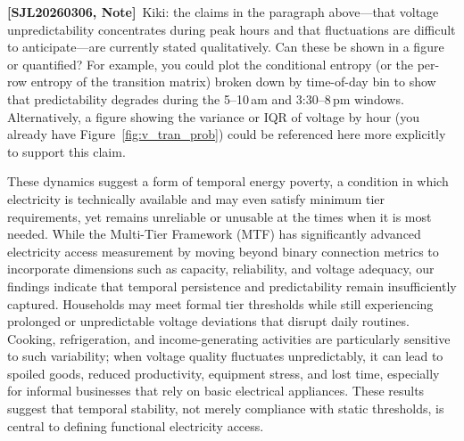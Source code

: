 \documentclass[review]{elsarticle}
\begin{document}
{\color{sjlmutedblue}\textbf{[SJL20260306, Note]}\ Kiki: the claims in the paragraph above---that voltage unpredictability concentrates during peak hours and that fluctuations are difficult to anticipate---are currently stated qualitatively. Can these be shown in a figure or quantified? For example, you could plot the conditional entropy (or the per-row entropy of the transition matrix) broken down by time-of-day bin to show that predictability degrades during the 5--10\,am and 3:30--8\,pm windows. Alternatively, a figure showing the variance or IQR of voltage by hour (you already have Figure~\ref{fig:v_tran_prob}) could be referenced here more explicitly to support this claim.}

These dynamics suggest a form of temporal energy poverty, a condition in which electricity is technically available and may even satisfy minimum tier requirements, yet remains unreliable or unusable at the times when it is most needed. While the Multi-Tier Framework (MTF) has significantly advanced electricity access measurement by moving beyond binary connection metrics to incorporate dimensions such as capacity, reliability, and voltage adequacy, our findings indicate that temporal persistence and predictability remain insufficiently captured. Households may meet formal tier thresholds while still experiencing prolonged or unpredictable voltage deviations that disrupt daily routines. Cooking, refrigeration, and income-generating activities are particularly sensitive to such variability; when voltage quality fluctuates unpredictably, it can lead to spoiled goods, reduced productivity, equipment stress, and lost time, especially for informal businesses that rely on basic electrical appliances. These results suggest that temporal stability, not merely compliance with static thresholds, is central to defining functional electricity access.

\end{document}
